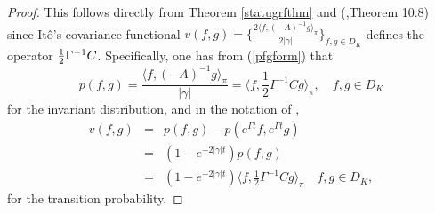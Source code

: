 \documentclass[11pt]{article}
\numberwithin{equation}{section}
\theoremstyle{definition}
\theoremstyle{remark}
\theoremstyle{definition}
\begin{document}
\begin{proof}
This follows directly from Theorem \ref{statugrfthm} and
 (\cite{ito},Theorem 10.8) since It\^o's covariance functional
 $v(f,g) =  \{\frac{2\langle f,(-A)^{-1}g\rangle_\pi}{2|\gamma|}\}_{f,g\in D_K}$ defines the operator ${1\over 2}\Gamma^{-1}C$. Specifically, one has from (\ref{pfgform}) 
that
 \begin{equation}
 p(f,g) = 
 \frac{\langle f,(-A)^{-1}g\rangle_\pi}{|\gamma|}
=\langle f,\frac{1}{2}\Gamma^{-1}Cg\rangle_\pi,
\quad f,g\in D_K
  \end{equation}
  for the invariant distribution, 
  and in the notation of \cite{ito},
  \begin{eqnarray}
  v(f,g)&=&p(f,g)-p(e^{\Gamma t}f,e^{\Gamma t}g)\nonumber\\
  &=& (1-e^{-2|\gamma|t})p(f,g)\nonumber\\
&=& (1-e^{-2|\gamma|t})\langle f,  \frac{1}{2}\Gamma^{-1}Cg\rangle_\pi \quad f,g\in D_K,
  \end{eqnarray}
  for the transition probability. 
\end{proof}
\end{document}
